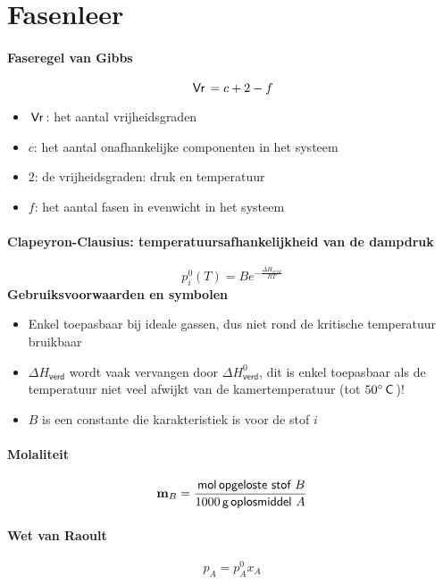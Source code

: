 \onecolumn
\newpage
\section{Fasenleer}
\label{sec:H:Fasenleer}

\paragraph{Faseregel van Gibbs}
\label{sec:FaseregelVanGibbs}
\[
  \,\textsf{Vr}\, = c + 2 - f
\]
\begin{itemize}
	\item $\,\textsf{Vr}\,$: het aantal vrijheidsgraden
	\item $c$: het aantal onafhankelijke componenten in het systeem
	\item $2$: de vrijheidsgraden: druk en temperatuur
	\item $f$: het aantal fasen in evenwicht in het systeem 
\end{itemize}

\paragraph{Clapeyron-Clausius: temperatuursafhankelijkheid van de dampdruk}
\[
  p_i^0 \left(T\right) = B e^{-\frac{\Delta H_{verd}}{RT}}
\]
\textbf{Gebruiksvoorwaarden en symbolen}
\begin{itemize}
	\item Enkel toepasbaar bij ideale gassen, dus niet rond de kritische temperatuur bruikbaar
	\item $\Delta H_{\textsf{verd}}$ wordt vaak vervangen door $\Delta H^0_{\textsf{verd}}$, 
	      dit is enkel toepasbaar als de temperatuur niet veel afwijkt van de kamertemperatuur (tot $50 ^\circ \,\textsf{C}\,$)!
	\item $B$ is een constante die karakteristiek is voor de stof $i$
\end{itemize}

\paragraph{Molaliteit}
\[
  \mathbf{m}_B = \frac{\,\textsf{mol}\, \textsf{opgeloste stof } B}{1000 \,\textsf{g}\, \textsf{oplosmiddel } A}
\]

\paragraph{Wet van Raoult}
\[
  p_A = p_A^0 x_A
\]

